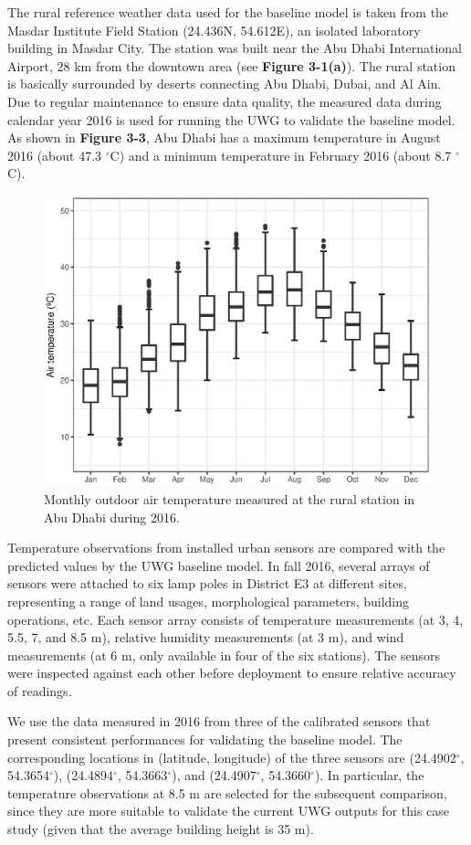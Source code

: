 The rural reference weather data used for the baseline model is taken from the Masdar Institute Field Station (24.436N, 54.612E), an isolated laboratory building in Masdar City. The station was built near the Abu Dhabi International Airport, 28 km from the downtown area (see \textbf{Figure 3-1(a)}). The rural station is basically surrounded by deserts connecting Abu Dhabi, Dubai, and Al Ain. Due to regular maintenance to ensure data quality, the measured data during calendar year 2016 is used for running the UWG to validate the baseline model. As shown in \textbf{Figure 3-3}, Abu Dhabi has a maximum temperature in August 2016 (about 47.3 $^{\circ}$C) and a minimum temperature in February 2016 (about 8.7 $^{\circ}$C).

\begin{figure}
\centering
\includegraphics[width=.6\linewidth]{Weather2016.eps}
\caption{Monthly outdoor air temperature measured at the rural station in Abu Dhabi during 2016.}
\end{figure}

Temperature observations from installed urban sensors are compared with the predicted values by the UWG baseline model. In fall 2016, several arrays of sensors were attached to six lamp poles in District E3 at different sites, representing a range of land usages, morphological parameters, building operations, etc. Each sensor array consists of temperature measurements (at 3, 4, 5.5, 7, and 8.5 m), relative humidity measurements (at 3 m), and wind measurements (at 6 m, only available in four of the six stations). The sensors were inspected against each other before deployment to ensure relative accuracy of readings.

We use the data measured in 2016 from three of the calibrated sensors that present consistent performances for validating the baseline model. The corresponding locations in (latitude, longitude) of the three sensors are (24.4902$^{\circ}$, 54.3654$^{\circ}$), (24.4894$^{\circ}$, 54.3663$^{\circ}$), and (24.4907$^{\circ}$, 54.3660$^{\circ}$). In particular, the temperature observations at 8.5 m are selected for the subsequent comparison, since they are more suitable to validate the current UWG outputs for this case study (given that the average building height is 35 m).

